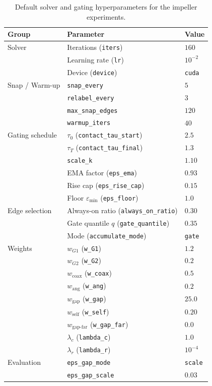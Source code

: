 \documentclass{ieeeaccess}
\begin{document}
\begin{table}[t]
  \caption{Default solver and gating hyperparameters for the impeller experiments.}
  \label{tab:hyperparams}
  \centering
  \footnotesize
  \setlength{\tabcolsep}{3pt}
  \begin{tabular}{l l l}
    \toprule
    \textbf{Group} & \textbf{Parameter} & \textbf{Value} \\
    \midrule
    Solver &
      Iterations (\texttt{iters}) & $160$ \\
    & Learning rate (\texttt{lr}) & $10^{-2}$ \\
    & Device (\texttt{device}) & \texttt{cuda} \\
    \midrule
    Snap / Warm-up &
      \texttt{snap\_every} & $5$ \\
    & \texttt{relabel\_every} & $3$ \\
    & \texttt{max\_snap\_edges} & $120$ \\
    & \texttt{warmup\_iters} & $40$ \\
    \midrule
    Gating schedule &
      $\tau_0$ (\texttt{contact\_tau\_start}) & $2.5$ \\
    & $\tau_T$ (\texttt{contact\_tau\_final}) & $1.3$ \\
    & \texttt{scale\_k} & $1.10$ \\
    & EMA factor (\texttt{eps\_ema}) & $0.93$ \\
    & Rise cap (\texttt{eps\_rise\_cap}) & $0.15$ \\
    & Floor $\varepsilon_{\min}$ (\texttt{eps\_floor}) & $1.0$ \\
    \midrule
    Edge selection &
      Always-on ratio (\texttt{always\_on\_ratio}) & $0.30$ \\
    & Gate quantile $q$ (\texttt{gate\_quantile}) & $0.35$ \\
    & Mode (\texttt{accumulate\_mode}) & \texttt{gate} \\
    \midrule
    Weights &
      $w_{G1}$ (\texttt{w\_G1}) & $1.2$ \\
    & $w_{G2}$ (\texttt{w\_G2}) & $0.2$ \\
    & $w_{\text{coax}}$ (\texttt{w\_coax}) & $0.5$ \\
    & $w_{\text{ang}}$ (\texttt{w\_ang}) & $0.2$ \\
    & $w_{\text{gap}}$ (\texttt{w\_gap}) & $25.0$ \\
    & $w_{\text{self}}$ (\texttt{w\_self}) & $0.20$ \\
    & $w_{\text{gap-far}}$ (\texttt{w\_gap\_far}) & $0.0$ \\
    & $\lambda_c$ (\texttt{lambda\_c}) & $1.0$ \\
    & $\lambda_r$ (\texttt{lambda\_r}) & $10^{-4}$ \\
    \midrule
    Evaluation &
      \texttt{eps\_gap\_mode} & \texttt{scale} \\
    & \texttt{eps\_gap\_scale} & $0.03$ \\
    \bottomrule
  \end{tabular}
\end{table}
\end{document}

